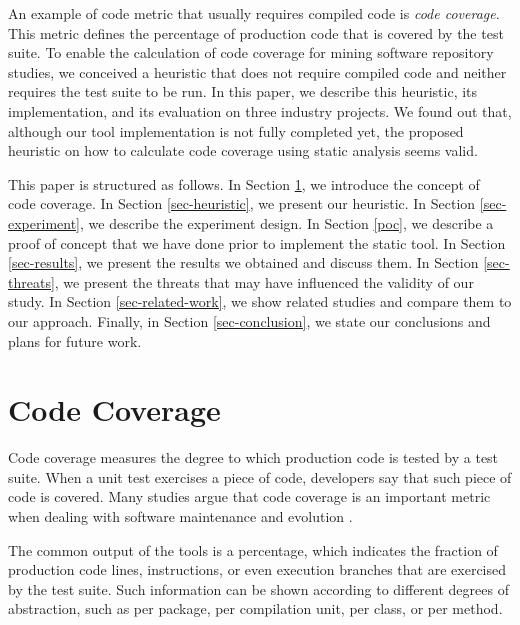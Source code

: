 \documentclass{sig-alternate}
\begin{document}
An example of code metric that usually requires compiled code is \textit{code coverage}. 
This metric defines the percentage of production code that is covered 
by the test suite. To enable the calculation of code coverage for mining software
repository studies, we conceived a heuristic that does not require compiled code
and neither requires the test suite to be run. In this paper, we describe this heuristic,
its implementation, and its evaluation on three industry projects. 
We found out that, although our tool implementation is not fully completed yet, the 
proposed heuristic on how to calculate code coverage using static analysis seems valid. 

This paper is structured as follows. In Section \ref{sec-code-coverage}, 
we introduce the concept of code coverage. In Section \ref{sec-heuristic}, 
we present our heuristic. In Section \ref{sec-experiment}, we describe the 
experiment design. In Section \ref{poc}, we describe a proof of concept that
we have done prior to implement the static tool. 
In Section \ref{sec-results}, we present the results we 
obtained and discuss them. In Section \ref{sec-threats}, 
we present the threats that may have influenced the validity of our study. 
In Section \ref{sec-related-work}, we show related studies and compare them 
to our approach. Finally, in Section \ref{sec-conclusion}, we state our 
conclusions and plans for future work.


\section{Code Coverage}
\label{sec-code-coverage}

Code coverage measures the degree to which production code is tested by a test suite. 
When a unit test exercises a piece of code, developers say that such piece
of code is covered. Many studies argue that code coverage is an important
metric when dealing with software maintenance and evolution \cite{sebastian} \cite{del-frate} \cite{mei-hwa}.

The common output of the tools is a percentage, which indicates the fraction of production code lines, instructions, 
or even execution branches that are exercised by the test suite. Such information can be shown according to different
degrees of abstraction, such as per package, per compilation unit, per class, or per method. 
\end{document}
